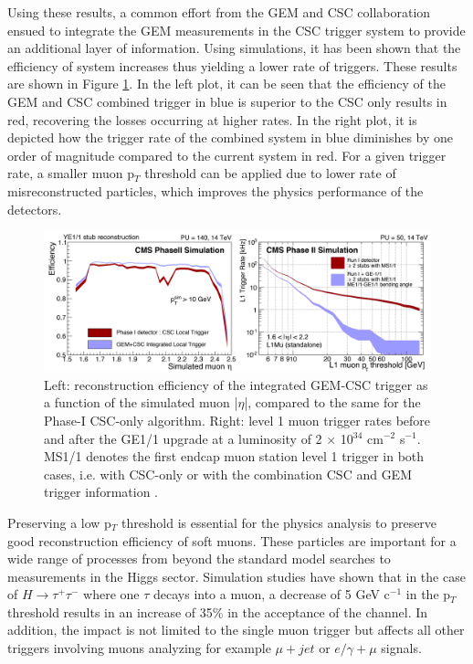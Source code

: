     Using these results, a common effort from the GEM and CSC collaboration ensued to integrate the GEM measurements in the CSC trigger system to provide an additional layer of information. Using simulations, it has been shown that the efficiency of system increases thus yielding a lower rate of triggers. These results are shown in Figure \ref{fig:II-1-trigger}. In the left plot, it can be seen that the efficiency of the GEM and CSC combined trigger in blue is superior to the CSC only results in red, recovering the losses occurring at higher rates. In the right plot, it is depicted how the trigger rate of the combined system in blue diminishes by one order of magnitude compared to the current system in red. For a given trigger rate, a smaller muon p$_T$ threshold can be applied due to lower rate of misreconstructed particles, which improves the physics performance of the detectors. \\

    \begin{figure}[h!]
      \centering
      \includegraphics[width=\textwidth]{img/II-1-gem/gem-csc-efficiency.pdf}
      \caption{Left: reconstruction efficiency of the integrated GEM-CSC trigger as a function of the simulated muon |$\eta$|, compared to the same for the Phase-I CSC-only algorithm. Right: level 1 muon trigger rates before and after the GE1/1 upgrade at a luminosity of 2 $\times$ 10$^{34}$ cm$^{-2}$ s$^{-1}$. MS1/1 denotes the first endcap muon station level 1 trigger in both cases, i.e. with CSC-only or with the combination CSC and GEM trigger information \cite{Colaleo:2021453}.}
      \label{fig:II-1-trigger}
    \end{figure}

    Preserving a low p$_T$ threshold is essential for the physics analysis to preserve good reconstruction efficiency of soft muons. These particles are important for a wide range of processes from beyond the standard model searches to measurements in the Higgs sector. Simulation studies have shown that in the case of $ H \rightarrow \tau^+ \tau^- $ where one $ \tau $ decays into a muon, a decrease of 5 GeV c$^{-1}$ in the p$_T$ threshold results in an increase of 35\% in the acceptance of the channel. In addition, the impact is not limited to the single muon trigger but affects all other triggers involving muons analyzing for example $\mu+jet$ or $e/\gamma+\mu$ signals. \\

